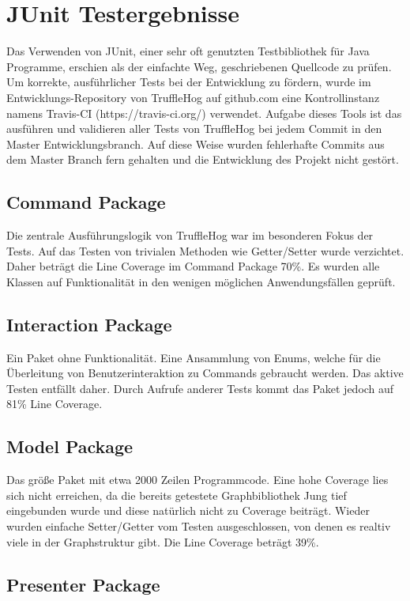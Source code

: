 \chapter{JUnit Testergebnisse}
Das Verwenden von JUnit, einer sehr oft genutzten Testbibliothek für Java Programme, erschien als der einfachte Weg, geschriebenen Quellcode zu prüfen. Um korrekte, ausführlicher Tests bei der Entwicklung zu fördern, wurde im Entwicklungs-Repository von TruffleHog auf github.com eine Kontrollinstanz namens Travis-CI (https://travis-ci.org/) verwendet. Aufgabe dieses Tools ist das ausführen und validieren aller Tests von TruffleHog bei jedem Commit in den Master Entwicklungsbranch. Auf diese Weise wurden fehlerhafte Commits aus dem Master Branch fern gehalten und die Entwicklung des Projekt nicht gestört.

\section{Command Package}

Die zentrale Ausführungslogik von TruffleHog war im besonderen Fokus der Tests. Auf das Testen von trivialen Methoden wie Getter/Setter wurde verzichtet. Daher beträgt die Line Coverage im Command Package  70\%. Es wurden alle Klassen auf Funktionalität in den wenigen möglichen Anwendungsfällen geprüft.

\section{Interaction Package}
Ein Paket ohne Funktionalität. Eine Ansammlung von Enums, welche für die Überleitung von Benutzerinteraktion zu Commands gebraucht werden. Das aktive Testen entfällt daher. Durch Aufrufe anderer Tests kommt das Paket jedoch auf 81\% Line Coverage.

\section{Model Package}
Das größe Paket mit etwa 2000 Zeilen Programmcode. Eine hohe Coverage lies sich nicht erreichen, da die bereits getestete Graphbibliothek Jung tief eingebunden wurde und diese natürlich nicht zu Coverage beiträgt. Wieder wurden einfache Setter/Getter vom Testen ausgeschlossen, von denen es realtiv viele in der Graphstruktur gibt. Die Line Coverage beträgt 39\%.

\section{Presenter Package}

